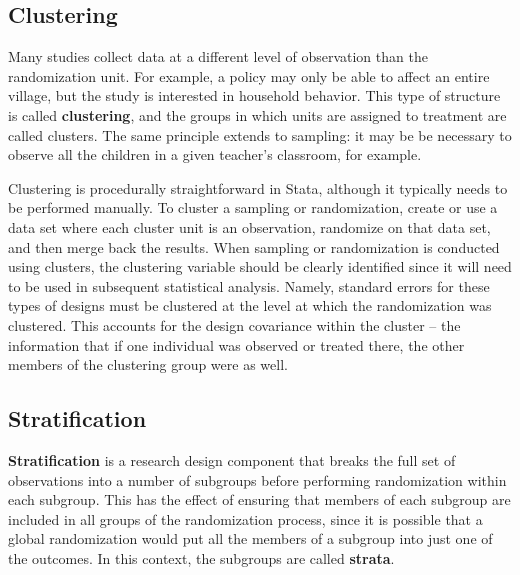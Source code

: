 \subsection{Clustering}

Many studies collect data at a different level of observation than the randomization unit.
For example, a policy may only be able to affect an entire village,
but the study is interested in household behavior.
This type of structure is called \textbf{clustering},
and the groups in which units are assigned to treatment are called clusters.
The same principle extends to sampling:
it may be be necessary to observe all the children
in a given teacher's classroom, for example.

Clustering is procedurally straightforward in Stata,
although it typically needs to be performed manually.
To cluster a sampling or randomization,
create or use a data set where each cluster unit is an observation,
randomize on that data set, and then merge back the results.
When sampling or randomization is conducted using clusters,
the clustering variable should be clearly identified
since it will need to be used in subsequent statistical analysis.
Namely, standard errors for these types of designs must be clustered
at the level at which the randomization was clustered.
This accounts for the design covariance within the cluster --
the information that if one individual was observed or treated there,
the other members of the clustering group were as well.

\subsection{Stratification}

\textbf{Stratification} is a research design component
that breaks the full set of observations into a number of subgroups
before performing randomization within each subgroup.
This has the effect of ensuring that members of each subgroup
are included in all groups of the randomization process,
since it is possible that a global randomization
would put all the members of a subgroup into just one of the outcomes.
In this context, the subgroups are called \textbf{strata}.

